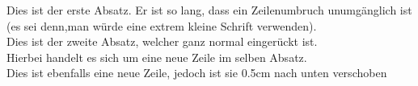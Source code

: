\documentclass[a4paper]{article}
\begin{document}
Dies  ist  der  erste  Absatz.  Er  ist  so  lang,  dass  ein  Zeilenumbruch  unumgänglich  ist  (es  sei  denn,man  würde  eine  extrem  kleine  Schrift  verwenden). \\ 

Dies  ist  der  zweite  Absatz,  welcher  ganz  normal eingerückt  ist. \\
Hierbei  handelt  es  sich  um  eine  neue  Zeile  im  selben  Absatz. \\[3cm]

Dies  ist  ebenfalls  eine  neue  Zeile,  jedoch  ist  sie  0.5cm  nach  unten  verschoben
\end{document}
